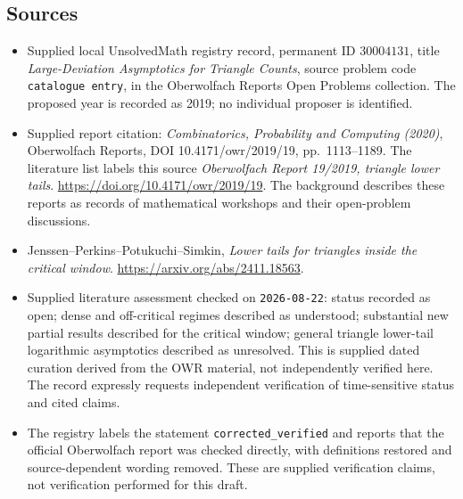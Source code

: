 \documentclass[11pt]{article}
\begin{document}
\subsection{Sources}
\begin{itemize}
\item Supplied local UnsolvedMath registry record, permanent ID \(30004131\), title \emph{Large-Deviation Asymptotics for Triangle Counts}, source problem code \texttt{catalogue entry}, in the Oberwolfach Reports Open Problems collection. The proposed year is recorded as 2019; no individual proposer is identified.
\item Supplied report citation: \emph{Combinatorics, Probability and Computing (2020)}, Oberwolfach Reports, DOI 10.4171/owr/2019/19, pp.\ 1113--1189. The literature list labels this source \emph{Oberwolfach Report 19/2019, triangle lower tails}. \url{https://doi.org/10.4171/owr/2019/19}. The background describes these reports as records of mathematical workshops and their open-problem discussions.
\item Jenssen--Perkins--Potukuchi--Simkin, \emph{Lower tails for triangles inside the critical window}. \url{https://arxiv.org/abs/2411.18563}.
\item Supplied literature assessment checked on \texttt{2026-08-22}: status recorded as open; dense and off-critical regimes described as understood; substantial new partial results described for the critical window; general triangle lower-tail logarithmic asymptotics described as unresolved. This is supplied dated curation derived from the OWR material, not independently verified here. The record expressly requests independent verification of time-sensitive status and cited claims.
\item The registry labels the statement \texttt{corrected\_verified} and reports that the official Oberwolfach report was checked directly, with definitions restored and source-dependent wording removed. These are supplied verification claims, not verification performed for this draft.
\end{itemize}
\end{document}
